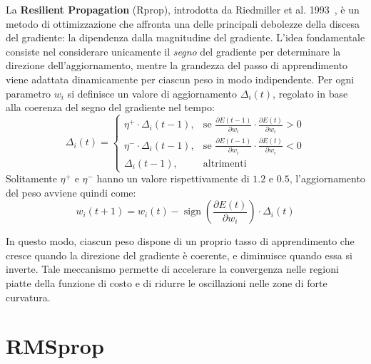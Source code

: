 La \textbf{Resilient Propagation} (Rprop), introdotta da Riedmiller et al. 1993~\cite{RiedmillerBraun1993}, è un metodo di ottimizzazione che affronta una delle principali debolezze della discesa del gradiente: la dipendenza dalla magnitudine del gradiente. L'idea fondamentale consiste nel considerare unicamente il \textit{segno} del gradiente per determinare la direzione dell'aggiornamento, mentre la grandezza del passo di apprendimento viene adattata dinamicamente per ciascun peso in modo indipendente. Per ogni parametro $w_i$ si definisce un valore di aggiornamento $\Delta_i(t)$, regolato in base alla coerenza del segno del gradiente nel tempo:
\[
\Delta_i(t) =
\begin{cases}
\eta^+ \cdot \Delta_i(t-1), & \text{se } \frac{\partial E(t-1)}{\partial w_i} \cdot \frac{\partial E(t)}{\partial w_i} > 0 \\[6pt]
\eta^- \cdot \Delta_i(t-1), & \text{se } \frac{\partial E(t-1)}{\partial w_i} \cdot \frac{\partial E(t)}{\partial w_i} < 0 \\[6pt]
\Delta_i(t-1), & \text{altrimenti}
\end{cases}
\]
Solitamente $\eta^+$ e $\eta^-$ hanno un valore rispettivamente di $1.2$ e $0.5$, l'aggiornamento del peso avviene quindi come:
\[
w_i(t+1) = w_i(t) - \operatorname{sign}\!\left(\frac{\partial E(t)}{\partial w_i}\right) \cdot \Delta_i(t)
\]

In questo modo, ciascun peso dispone di un proprio tasso di apprendimento che cresce quando la direzione del gradiente è coerente, e diminuisce quando essa si inverte. Tale meccanismo permette di accelerare la convergenza nelle regioni piatte della funzione di costo e di ridurre le oscillazioni nelle zone di forte curvatura.

\section{RMSprop}


